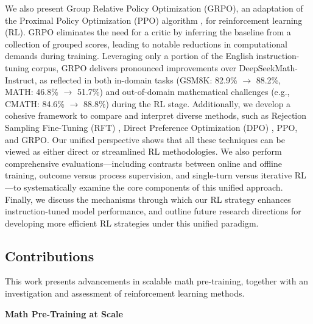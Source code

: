 We also present Group Relative Policy Optimization (GRPO), an adaptation of the Proximal Policy Optimization (PPO) algorithm \citep{schulman2017proximal}, for reinforcement learning (RL). GRPO eliminates the need for a critic by inferring the baseline from a collection of grouped scores, leading to notable reductions in computational demands during training. Leveraging only a portion of the English instruction-tuning corpus, GRPO delivers pronounced improvements over DeepSeekMath-Instruct, as reflected in both in-domain tasks (GSM8K: 82.9\% $\rightarrow$ 88.2\%, MATH: 46.8\% $\rightarrow$ 51.7\%) and out-of-domain mathematical challenges (e.g., CMATH: 84.6\% $\rightarrow$ 88.8\%) during the RL stage. Additionally, we develop a cohesive framework to compare and interpret diverse methods, such as Rejection Sampling Fine-Tuning (RFT) \citep{yuan2023scaling}, Direct Preference Optimization (DPO) \citep{dpo}, PPO, and GRPO. Our unified perspective shows that all these techniques can be viewed as either direct or streamlined RL methodologies. We also perform comprehensive evaluations—including contrasts between online and offline training, outcome versus process supervision, and single-turn versus iterative RL—to systematically examine the core components of this unified approach. Finally, we discuss the mechanisms through which our RL strategy enhances instruction-tuned model performance, and outline future research directions for developing more efficient RL strategies under this unified paradigm.

\subsection{Contributions}
This work presents advancements in scalable math pre-training, together with an investigation and assessment of reinforcement learning methods.

\textbf{Math Pre-Training at Scale}

